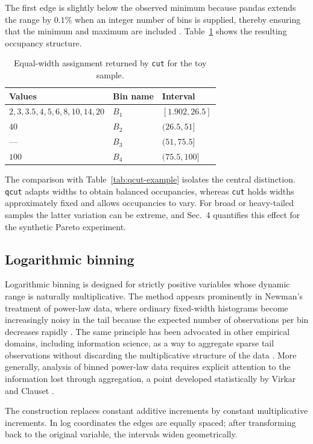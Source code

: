 The first edge is slightly below the observed minimum because pandas extends the range by $0.1\%$ when an integer number of bins is supplied, thereby ensuring that the minimum and maximum are included \cite{PandasCut}. Table~\ref{tab:cut-example} shows the resulting occupancy structure.

\begin{table}[htbp]
\centering
\caption{Equal-width assignment returned by \texttt{cut} for the toy sample.}
\label{tab:cut-example}
\begin{tabular}{lll}
\toprule
Values & Bin name & Interval \\
\midrule
$2,3,3.5,4,5,6,8,10,14,20$ & $B_1$ & $[1.902,26.5]$ \\
$40$ & $B_2$ & $(26.5,51]$ \\
--- & $B_3$ & $(51,75.5]$ \\
$100$ & $B_4$ & $(75.5,100]$ \\
\bottomrule
\end{tabular}
\end{table}

The comparison with Table~\ref{tab:qcut-example} isolates the central distinction. \texttt{qcut} adapts widths to obtain balanced occupancies, whereas \texttt{cut} holds widths approximately fixed and allows occupancies to vary. For broad or heavy-tailed samples the latter variation can be extreme, and Sec.~4 quantifies this effect for the synthetic Pareto experiment.

\subsection{Logarithmic binning}

Logarithmic binning is designed for strictly positive variables whose dynamic range is naturally multiplicative. The method appears prominently in Newman's treatment of power-law data, where ordinary fixed-width histograms become increasingly noisy in the tail because the expected number of observations per bin decreases rapidly \cite{Newman2005}. The same principle has been advocated in other empirical domains, including information science, as a way to aggregate sparse tail observations without discarding the multiplicative structure of the data \cite{Milojevic2010}. More generally, analysis of binned power-law data requires explicit attention to the information lost through aggregation, a point developed statistically by Virkar and Clauset \cite{VirkarClauset2014}.

The construction replaces constant additive increments by constant multiplicative increments. In log coordinates the edges are equally spaced; after transforming back to the original variable, the intervals widen geometrically.

